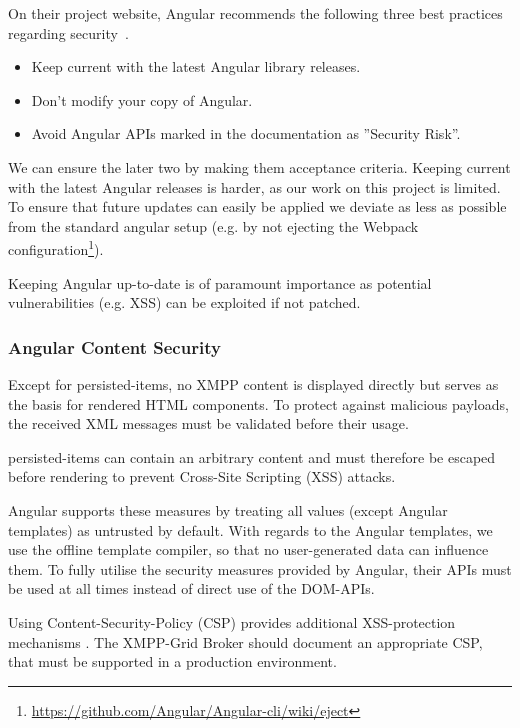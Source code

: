 On their project website, Angular recommends the following three best practices regarding security~\cite{angular-security}.

\begin{itemize}
    \item Keep current with the latest Angular library releases.
    \item Don't modify your copy of Angular.
    \item Avoid Angular APIs marked in the documentation as ''Security Risk''.
\end{itemize}

We can ensure the later two by making them acceptance criteria.
Keeping current with the latest Angular releases is harder, as our work on this project is limited.
To ensure that future updates can easily be applied we deviate as less as possible from the standard angular setup (e.g. by not ejecting the Webpack configuration\footnote{\url{https://github.com/Angular/Angular-cli/wiki/eject}}).

Keeping Angular up-to-date is of paramount importance as potential vulnerabilities (e.g. XSS) can be exploited if not patched.

\subsubsection{Angular Content Security}

Except for \glspl{persisted-item}, no XMPP content is displayed directly but serves as the basis for rendered HTML components.
To protect against malicious payloads, the received XML messages must be validated before their usage.

\Glspl{persisted-item} can contain an arbitrary content and must therefore be escaped before rendering to prevent Cross-Site Scripting (XSS) attacks.

Angular supports these measures by treating all values (except Angular templates) as untrusted by default.
With regards to the Angular templates, we use the offline template compiler, so that no user-generated data can influence them. To fully utilise the security measures provided by Angular, their APIs must be used at all times instead of direct use of the DOM-APIs.~\cite{angular-security}

Using Content-Security-Policy (CSP) provides additional XSS-protection mechanisms \cite{w3c-csp}.
The XMPP-Grid Broker should document an appropriate CSP, that must be supported in a production environment.

